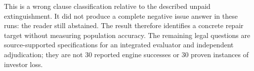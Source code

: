 This is a wrong clause classification relative to the described unpaid
extinguishment. It did not produce a complete negative issue answer in
these runs: the reader still abstained. The result therefore identifies
a concrete repair target without measuring population accuracy.
The remaining legal questions are source-supported specifications for an
integrated evaluator and independent adjudication; they are not 30 reported
engine successes or 30 proven instances of investor loss.
